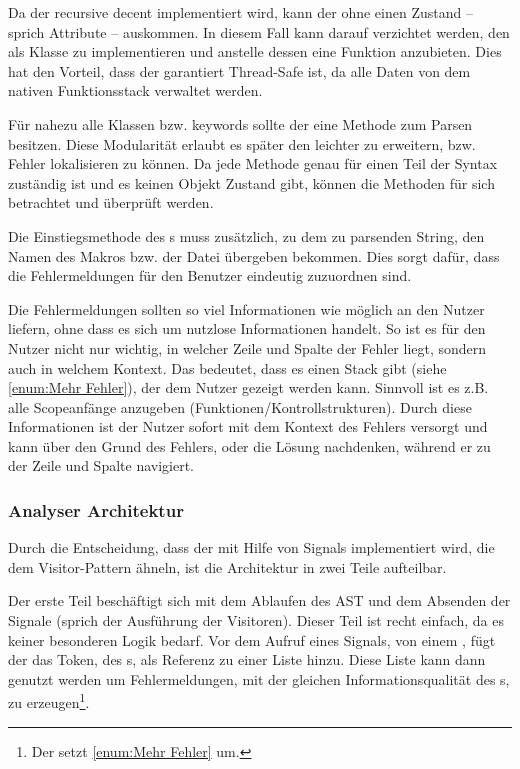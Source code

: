 {      Da der  recursive decent implementiert wird, kann der  ohne einen Zustand -- sprich Attribute -- auskommen. In diesem Fall kann darauf verzichtet werden, den  als Klasse zu implementieren und anstelle dessen eine  Funktion anzubieten. Dies hat den Vorteil, dass der  garantiert Thread-Safe ist, da alle Daten von dem nativen Funktionsstack verwaltet werden.

      Für nahezu alle  Klassen bzw. keywords sollte der  eine Methode zum Parsen besitzen. Diese Modularität erlaubt es später den  leichter zu erweitern, bzw. Fehler lokalisieren zu können. Da jede Methode genau für einen Teil der Syntax zuständig ist und es keinen Objekt Zustand gibt, können die Methoden für sich betrachtet und überprüft werden.

      Die Einstiegsmethode des s muss zusätzlich, zu dem zu parsenden String, den Namen des Makros bzw. der Datei übergeben bekommen. Dies sorgt dafür, dass die Fehlermeldungen für den Benutzer eindeutig zuzuordnen sind.

      Die Fehlermeldungen sollten so viel Informationen wie möglich an den Nutzer liefern, ohne dass es sich um nutzlose Informationen handelt. So ist es für den Nutzer nicht nur wichtig, in welcher Zeile und Spalte der Fehler liegt, sondern auch in welchem Kontext. Das bedeutet, dass es einen Stack gibt (siehe \ref{enum:Mehr Fehler}), der dem Nutzer gezeigt werden kann. Sinnvoll ist es z.B. alle Scopeanfänge anzugeben (Funktionen/Kontrollstrukturen). Durch diese Informationen ist der Nutzer sofort mit dem Kontext des Fehlers versorgt und kann über den Grund des Fehlers, oder die Lösung  nachdenken, während er zu der Zeile und Spalte navigiert.

    \subsubsection{Analyser Architektur}
    \label{sssec:Analyser Architektur}
      Durch die Entscheidung, dass der  mit Hilfe von Signals implementiert wird, die dem Visitor-Pattern ähneln, ist die Architektur in zwei Teile aufteilbar.

      Der erste Teil beschäftigt sich mit dem Ablaufen des AST und dem Absenden der Signale (sprich der Ausführung der Visitoren). Dieser Teil ist recht einfach, da es keiner besonderen Logik bedarf. Vor dem Aufruf eines Signals, von einem , fügt der  das Token, des s, als Referenz zu einer Liste hinzu. Diese Liste kann dann genutzt werden um Fehlermeldungen, mit der gleichen Informationsqualität des s, zu erzeugen\footnote{
        Der  setzt \ref{enum:Mehr Fehler} um.
      }.

}
